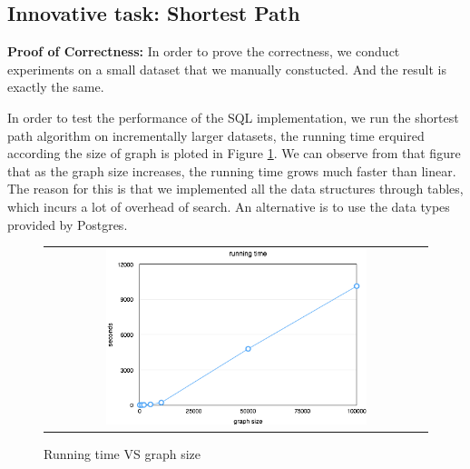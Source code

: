 \subsection{Innovative task: Shortest Path}
{\bf Proof of Correctness: } In order to prove the correctness, we conduct experiments on a small dataset that we manually constucted. And the result is exactly the same. 

In order to test the performance of the SQL implementation, we run the shortest path algorithm on incrementally larger datasets, the
running time erquired according the size of graph is ploted in Figure \ref{sp:plot}. We can observe from that figure that as the graph size increases, the running time grows much faster than linear. The reason for this is that we implemented all the data structures through
tables, which incurs a lot of overhead of search. An alternative is to use the data types provided by Postgres. 

\begin{figure}[!htbf]
\begin{center}
\begin{tabular}{c}
     \includegraphics[width=0.7\textwidth]{FIG/sp_plot.png}
\end{tabular}
\caption{Running time VS graph size}
\label{sp:plot}
\end{center}
\end{figure}